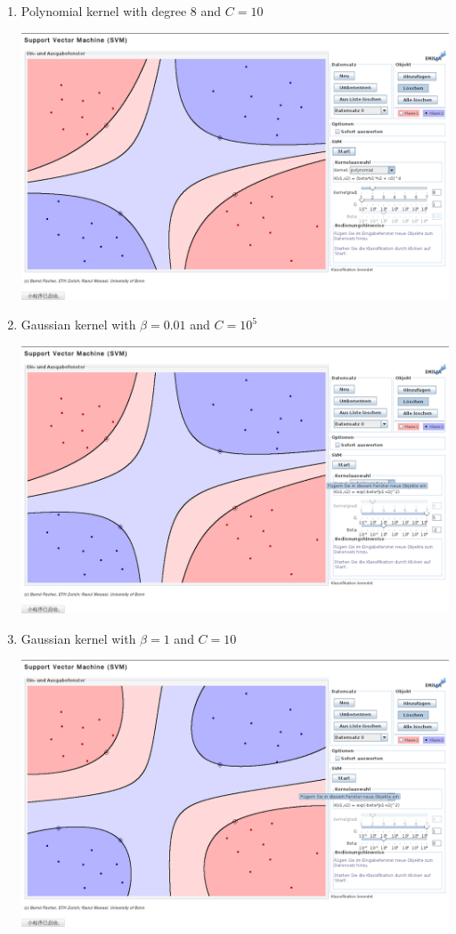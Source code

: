 \documentclass{article}[11pt]
\begin{document}
\begin{enumerate}
\item 
Polynomial kernel with degree $8$ and $C=10$
\begin{center}
  \includegraphics[width=.9\textwidth]{a-poly8-c1}
\end{center}

\item 
Gaussian kernel with $\beta = 0.01$ and $C=10^5$
\begin{center}
  \includegraphics[width=.9\textwidth]{a-rbf-b-2-c5}
\end{center}

\item 
Gaussian kernel with $\beta = 1$ and $C=10$
\begin{center}
  \includegraphics[width=.9\textwidth]{a-rbf-b0-c1}
\end{center}


\end{enumerate}
\end{document}
